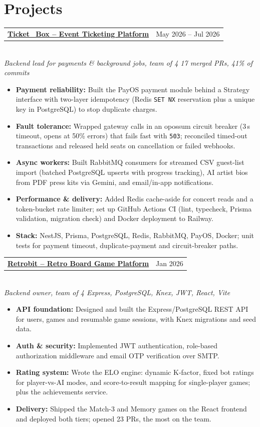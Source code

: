 \documentclass[11pt,a4paper]{article}
\makeatletter
\newcommand{\entry}[3]{%
  \begin{tabularx}{\linewidth}{@{}X r@{}}
    \textbf{#1} & #2 \\
  \end{tabularx}\\[-2pt]
  {\itshape #3}\par
}
\makeatother
\begin{document}
\section{Projects}
\entry{\href{https://tranquocvy.github.io/projects/ticket-box/}{Ticket\_Box -- Event Ticketing Platform}}{May 2026 -- Jul 2026}%
{Backend lead for payments \& background jobs, team of 4 \textbullet{} 17 merged PRs, 41\% of commits}
\begin{itemize}
  \item \textbf{Payment reliability:} Built the PayOS payment module behind a Strategy interface with two-layer
        idempotency (Redis \texttt{SET NX} reservation plus a unique key in PostgreSQL) to stop duplicate charges.
  \item \textbf{Fault tolerance:} Wrapped gateway calls in an opossum circuit breaker (3\,s timeout, opens at 50\%
        errors) that fails fast with \texttt{503}; reconciled timed-out transactions and released held seats on
        cancellation or failed webhooks.
  \item \textbf{Async workers:} Built RabbitMQ consumers for streamed CSV guest-list import (batched PostgreSQL
        upserts with progress tracking), AI artist bios from PDF press kits via Gemini, and email/in-app notifications.
  \item \textbf{Performance \& delivery:} Added Redis cache-aside for concert reads and a token-bucket rate limiter;
        set up GitHub Actions CI (lint, typecheck, Prisma validation, migration check) and Docker deployment to Railway.
  \item \textbf{Stack:} NestJS, Prisma, PostgreSQL, Redis, RabbitMQ, PayOS, Docker; unit tests for payment timeout,
        duplicate-payment and circuit-breaker paths.
\end{itemize}

\vspace{3pt}
\entry{\href{https://tranquocvy.github.io/projects/retrobit/}{Retrobit -- Retro Board Game Platform}}{Jan 2026}%
{Backend owner, team of 4 \textbullet{} Express, PostgreSQL, Knex, JWT, React, Vite}
\begin{itemize}
  \item \textbf{API foundation:} Designed and built the Express/PostgreSQL REST API for users, games and
        resumable game sessions, with Knex migrations and seed data.
  \item \textbf{Auth \& security:} Implemented JWT authentication, role-based authorization middleware and email
        OTP verification over SMTP.
  \item \textbf{Rating system:} Wrote the ELO engine: dynamic K-factor, fixed bot ratings for player-vs-AI modes,
        and score-to-result mapping for single-player games; plus the achievements service.
  \item \textbf{Delivery:} Shipped the Match-3 and Memory games on the React frontend and deployed both tiers;
        opened 23 PRs, the most on the team.
\end{itemize}
\end{document}
